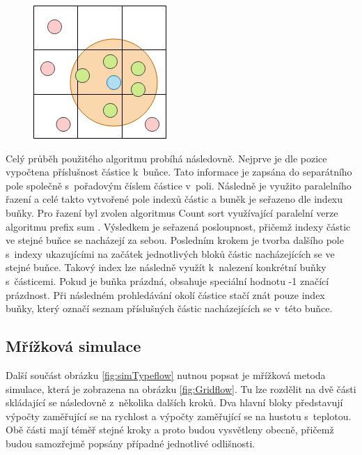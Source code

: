 \begin{figure}[hbt]
	\centering
	\captionsetup{justification=centering}
	\includegraphics[scale=0.6]{obrazky-figures/GridSPH.png}
	\label{fig:GridSPH}
\end{figure}

Celý průběh použitého algoritmu probíhá následovně. Nejprve je dle pozice vypočtena příslušnost částice k~buňce. Tato informace je zapsána do separátního pole společně s~pořadovým číslem částice v~poli. Následně je využito paralelního řazení a celé takto vytvořené pole indexů částic a buněk je seřazeno dle indexu buňky. Pro řazení byl zvolen algoritmus Count sort \cite{CountSortGPU} využívající paralelní verze algoritmu prefix sum \cite{GPUGemsPrefixSum}. Výsledkem je seřazená posloupnost, přičemž indexy částic ve stejné buňce se nacházejí za sebou. Posledním krokem je tvorba dalšího pole s~indexy ukazujícími na začátek jednotlivých bloků částic nacházejících se ve stejné buňce. Takový index lze následně využít k~nalezení konkrétní buňky s~částicemi. Pokud je buňka prázdná, obsahuje speciální hodnotu -1 značící prázdnost. Při následném prohledávání okolí částice stačí znát pouze index buňky, který označí seznam příslušných částic nacházejících se v~této buňce.

\subsection{Mřížková simulace}
\label{chapter:simGrid}
Další součást obrázku \ref{fig:simTypeflow} nutnou popsat je mřížková metoda simulace, která je zobrazena na obrázku \ref{fig:Gridflow}. Tu lze rozdělit na dvě části skládající se následovně z~několika dalších kroků. Dva hlavní bloky představují výpočty zaměřující se na rychlost a výpočty zaměřující se na hustotu s~teplotou. Obě části mají téměř stejné kroky a proto budou vysvětleny obecně, přičemž budou samozřejmě popsány případné jednotlivé odlišnosti.

